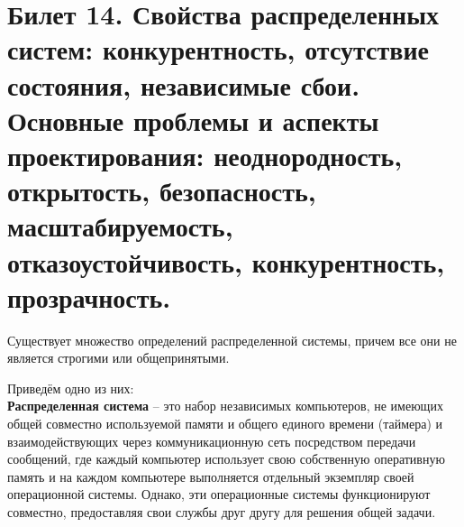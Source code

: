 \newpage
\section{Билет 14. Свойства распределенных систем: конкурентность, отсутствие состояния, независимые сбои. Основные проблемы и аспекты проектирования: неоднородность, открытость, безопасность, масштабируемость, отказоустойчивость, конкурентность, прозрачность.}

Существует множество определений распределенной системы, причем все они не является строгими или общепринятыми.

Приведём одно из них:\\
\textbf{Распределенная  система} – это набор  независимых  компьютеров,  не имеющих общей совместно используемой памяти и общего единого времени (таймера) и взаимодействующих через коммуникационную сеть  посредством  передачи  сообщений,  где  каждый  компьютер использует  свою  собственную  оперативную  память  и  на  каждом компьютере выполняется отдельный  экземпляр  своей  операционной  системы. Однако,  эти  операционные  системы  функционируют  совместно, предоставляя свои службы друг другу для решения общей задачи.\\

